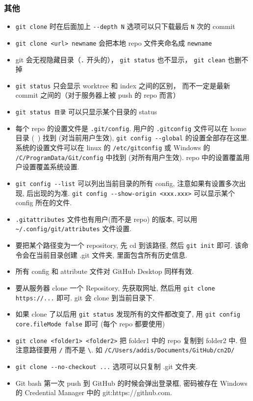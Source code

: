 \subsubsection{其他}
\begin{itemize}
\item \verb|git clone| 时在后面加上 \verb|--depth N| 选项可以只下载最后 \verb|N| 次的 commit
\item \verb|git clone <url> newname| 会把本地 repo 文件夹命名成 \verb|newname|
\item git 会无视隐藏目录（\verb|.| 开头的）， \verb|git status| 也不显示， \verb|git clean| 也删不掉
\item \verb|git status| 只会显示 worktree 和 index 之间的区别， 而不一定是最新 commit 之间的（对于服务器上被 push 的 repo 而言）
\item \verb|git status 目录| 可以只显示某个目录的 status
\item 每个 repo 的设置文件是 \verb|.git/config|. 用户的 \verb|.gitconfig| 文件可以在 home 目录 (~) 找到 (对当前用户生效), \verb|git config --global| 的设置全部存在这里. 系统的设置文件可以在 linux 的 \verb|/etc/gitconfig| 或 Windows 的 \verb|/C/ProgramData/Git/config| 中找到 (对所有用户生效). repo 中的设置覆盖用户设置覆盖系统设置.
\item \verb|git config --list| 可以列出当前目录的所有 config, 注意如果有设置多次出现, 后出现的为准. \verb|git config --show-origin <xxx.xxx>| 可以显示某个 config 所在的文件.
\item \verb|.gitattributes| 文件也有用户(而不是 repo) 的版本, 可以用 \verb|~/.config/git/attributes| 文件设置.
\item 要把某个路径变为一个 repository, 先 cd 到该路径, 然后 \verb|git init| 即可. 该命令会在当前目录创建 .git 文件夹, 里面包含所有历史信息.
\item 所有 config 和 attribute 文件对 GitHub Desktop 同样有效.
\item 要从服务器 clone 一个 Repository, 先获取网址, 然后用 \verb|git clone https://...| 即可. git 会 clone 到当前目录下.
\item 如果 clone 了以后用 \verb|git status| 发现所有的文件都改变了, 用 \verb|git config core.fileMode false| 即可 (每个 repo 都要使用)
\item \verb|git clone <folder1> <folder2>| 把 folder1 中的 repo 复制到 folder2 中. 但注意路径要用 \verb|/| 而不是 \verb|\|. 如 \verb|/C/Users/addis/Documents/GitHub/cn2D/|
\item \verb|git clone --no-checkout ...| 选项可以只复制 .git 文件夹.
\item Git bash 第一次 push 到 GitHub 的时候会弹出登录框, 密码被存在 Windows 的 Credential Manager 中的 git:https://github.com.

\end{itemize}

